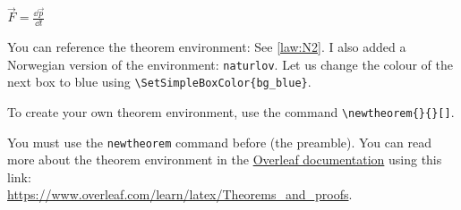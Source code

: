 \begin{simplebox}
\begin{Sclaw}
\label{law:N2}
$\vec{F}=\frac{\dd \vec{p}}{\dd t}$
\end{Sclaw}
\end{simplebox}
You can reference the theorem environment: See \cref{law:N2}. I also added a Norwegian version of the environment: \verb+naturlov+.
Let us change the colour of the next box to blue using \verb?\SetSimpleBoxColor{bg_blue}?.

\begin{simplebox}
To create your own theorem environment, use the command \verb?\newtheorem{}{}[]?.
\end{simplebox}

You must use the \verb+newtheorem+ command before \verb?? (the preamble). You can read more about the theorem environment in the \href{https://www.overleaf.com/learn/latex/Theorems_and_proofs}{Overleaf documentation} using this link:\\ \url{https://www.overleaf.com/learn/latex/Theorems_and_proofs}.
